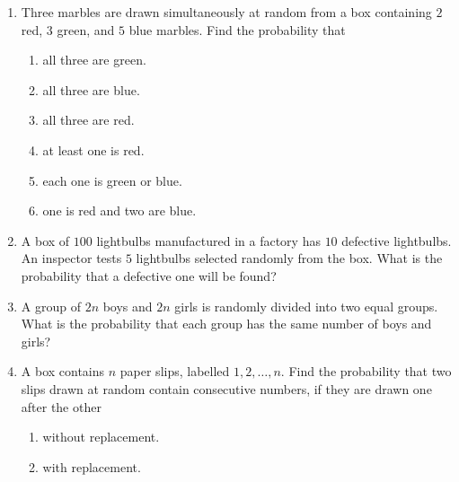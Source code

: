\documentclass[svgnames]{amsart}
\begin{document}
\begin{enumerate}
\item Three marbles are drawn simultaneously at random from a box containing $2$ red, $3$ green, and $5$ blue marbles. Find the probability that
\begin{enumerate}
	\item all three are green.
	\item all three are blue.
	\item all three are red.
	\item at least one is red.
	\item each one is green or blue.
	\item one is red and two are blue.
\end{enumerate}

\item A box of $100$ lightbulbs manufactured in a factory has $10$ defective lightbulbs. An inspector tests $5$ lightbulbs selected randomly from the box. What is the probability that a defective one will be found?

\item A group of $2n$ boys and $2n$ girls is randomly divided into two equal groups. What is the probability that each group has the same number of boys and girls?

\item A box contains $n$ paper slips, labelled $1, 2, \ldots, n$. Find the probability that two slips drawn at random contain consecutive numbers, if they are drawn one after the other
\begin{enumerate}
	\item without replacement.
	\item with replacement.
\end{enumerate}
\end{enumerate} %
\end{document}
